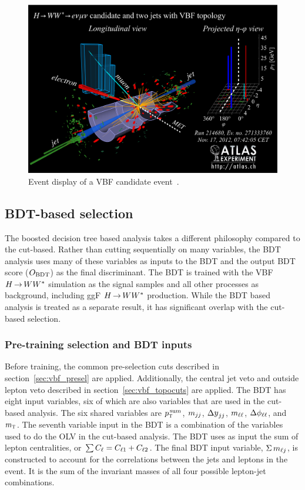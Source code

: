 \begin{figure}[h!]
  \centering
  \captionsetup{justification=centering}
  \includegraphics[width=\textwidth]{figures/eventdisplay}

  \caption{Event display of a VBF candidate event~\cite{WW2015}.}
  \label{fig:eventdisplay}
\end{figure}                                                                                     


\subsection{BDT-based selection}

The boosted decision tree based analysis takes a different philosophy compared to the cut-based. Rather than cutting sequentially on many variables, the BDT analysis uses many of these variables as inputs to the BDT and the output BDT score ($O_{\rm BDT}$) as the final discriminant. The BDT is trained with the VBF $H{\,{\rightarrow}\,}WW^\ast$ simulation as the signal samples and all other processes as background, including ggF $H{\,{\rightarrow}\,}WW^\ast$ production. While the BDT based analysis is treated as a separate result, it has significant overlap with the cut-based selection.

\subsubsection{Pre-training selection and BDT inputs}
Before training, the common pre-selection cuts described in section~\ref{sec:vbf_presel} are applied. Additionally, the central jet veto and outside lepton veto described in section~\ref{sec:vbf_topocuts} are applied. The BDT has eight input variables, six of which are also variables that are used in the cut-based analysis. The six shared variables are $p_{\textrm{\footnotesize\sc t}}^{\,\rm sum}$, $m_{jj}$, $\dyjj$, $m_{\ell\ell}$, $\Delta\phi_{\ell\ell}$, and $m_{\textrm{\footnotesize\sc t}}$. The seventh variable input in the BDT is a combination of the variables used to do the OLV in the cut-based analysis. The BDT uses as input the sum of lepton centralities, or $\sum C_{\ell} = C_{\ell1} + C_{\ell2}$. The final BDT input variable, $\Sigma\,m_{\ell j}$, is constructed to account for the correlations between the jets and leptons in the event. It is the sum of the invariant masses of all four possible lepton-jet combinations.

